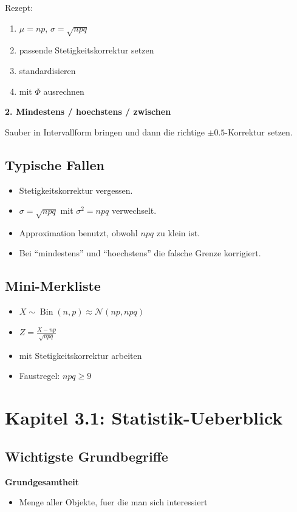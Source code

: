 \documentclass[a4paper,11pt]{article}
\begin{document}
Rezept:
\begin{enumerate}
  \item $\mu=np$, $\sigma=\sqrt{npq}$
  \item passende Stetigkeitskorrektur setzen
  \item standardisieren
  \item mit $\Phi$ ausrechnen
\end{enumerate}

\textbf{2. Mindestens / hoechstens / zwischen}

Sauber in Intervallform bringen und dann die richtige $\pm 0.5$-Korrektur setzen.

\subsection{Typische Fallen}
\begin{itemize}
  \item Stetigkeitskorrektur vergessen.
  \item $\sigma=\sqrt{npq}$ mit $\sigma^2=npq$ verwechselt.
  \item Approximation benutzt, obwohl $npq$ zu klein ist.
  \item Bei ``mindestens'' und ``hoechstens'' die falsche Grenze korrigiert.
\end{itemize}

\subsection{Mini-Merkliste}
\begin{itemize}
  \item $\displaystyle X\sim \operatorname{Bin}(n,p)\approx \mathcal N(np,npq)$
  \item $\displaystyle Z=\frac{X-np}{\sqrt{npq}}$
  \item mit Stetigkeitskorrektur arbeiten
  \item Faustregel: $\displaystyle npq\ge 9$
\end{itemize}

\section{Kapitel 3.1: Statistik-Ueberblick}

\subsection{Wichtigste Grundbegriffe}
\textbf{Grundgesamtheit}
\begin{itemize}
  \item Menge aller Objekte, fuer die man sich interessiert
\end{itemize}
\end{document}
